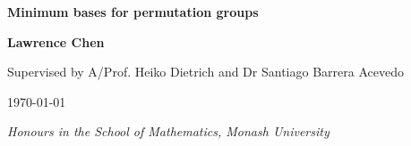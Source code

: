 \begin{titlepage}
    \begin{center}
        \vspace*{4cm}

        \Huge
        \textbf{Minimum bases for permutation groups}

        \vspace{2cm}

        \LARGE
        \textbf{Lawrence Chen}

        \Large
        Supervised by A/Prof. Heiko Dietrich and Dr Santiago Barrera Acevedo

        \vspace{2cm}

        \Large
        \today

        \vfill

        \textit{Honours \thesis{} in the School of Mathematics, Monash University}
    \end{center}
\end{titlepage}